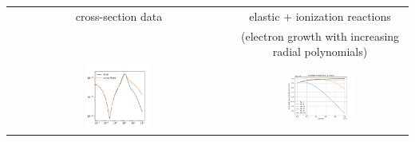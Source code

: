 \documentclass[landscape,archE,fontscale=0.285]{baposter} %
\begin{document}
\begin{poster}
{  \begin{tabular}{cc}
    cross-section data &  elastic + ionization reactions  \\
    & (electron growth with increasing radial polynomials) \\
    \includegraphics[width=0.3\textwidth]{img/lxcat_vs_curve_fitted.png} &
    \includegraphics[width=0.4\textwidth]{img/g02_mw_mass.png} \\
  \end{tabular}

}
\end{poster}
\end{document}
